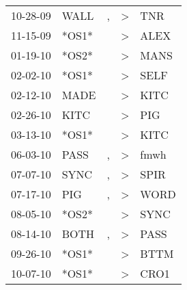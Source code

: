 \begin{supertabular}{p{0.07\textwidth}p{0.06\textwidth}p{0.02\textwidth}p{0.02\textwidth}p{0.06\textwidth}}
          10-28-09\textsuperscript{} &           WALL\textsuperscript{} &                , &     \textgreater &            TNR\textsuperscript{} \\
          11-15-09\textsuperscript{} &                            *OS1* &                  &     \textgreater &           ALEX\textsuperscript{} \\
          01-19-10\textsuperscript{} &                            *OS2* &                  &     \textgreater &           MANS\textsuperscript{} \\
          02-02-10\textsuperscript{} &                            *OS1* &                  &     \textgreater &           SELF\textsuperscript{} \\
          02-12-10\textsuperscript{} &           MADE\textsuperscript{} &                  &     \textgreater &           KITC\textsuperscript{} \\
          02-26-10\textsuperscript{} &           KITC\textsuperscript{} &                  &     \textgreater &            PIG\textsuperscript{} \\
          03-13-10\textsuperscript{} &                            *OS1* &                  &     \textgreater &           KITC\textsuperscript{} \\
          06-03-10\textsuperscript{} &           PASS\textsuperscript{} &                , &     \textgreater &           fmwh\textsuperscript{} \\
          07-07-10\textsuperscript{} &           SYNC\textsuperscript{} &                , &     \textgreater &           SPIR\textsuperscript{} \\
          07-17-10\textsuperscript{} &            PIG\textsuperscript{} &                , &     \textgreater &           WORD\textsuperscript{} \\
          08-05-10\textsuperscript{} &                            *OS2* &                  &     \textgreater &           SYNC\textsuperscript{} \\
          08-14-10\textsuperscript{} &           BOTH\textsuperscript{} &                , &     \textgreater &           PASS\textsuperscript{} \\
          09-26-10\textsuperscript{} &                            *OS1* &                  &     \textgreater &           BTTM\textsuperscript{} \\
          10-07-10\textsuperscript{} &                            *OS1* &                  &     \textgreater &           CRO1\textsuperscript{} \\

\end{supertabular}
